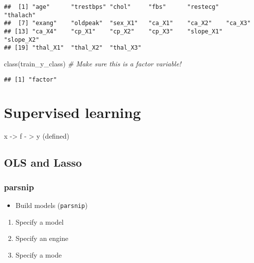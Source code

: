 \documentclass[
]{book}
\newenvironment{Shaded}{\begin{snugshade}}{\end{snugshade}}
\newcommand{\CommentTok}[1]{\textcolor[rgb]{0.56,0.35,0.01}{\textit{#1}}}
\newcommand{\FunctionTok}[1]{\textcolor[rgb]{0.00,0.00,0.00}{#1}}
\newcommand{\NormalTok}[1]{#1}
\providecommand{\tightlist}{%
  \setlength{\itemsep}{0pt}\setlength{\parskip}{0pt}}
\begin{document}
\begin{verbatim}
##  [1] "age"      "trestbps" "chol"     "fbs"      "restecg"  "thalach" 
##  [7] "exang"    "oldpeak"  "sex_X1"   "ca_X1"    "ca_X2"    "ca_X3"   
## [13] "ca_X4"    "cp_X1"    "cp_X2"    "cp_X3"    "slope_X1" "slope_X2"
## [19] "thal_X1"  "thal_X2"  "thal_X3"
\end{verbatim}

\begin{Shaded}
\begin{Highlighting}[]
\FunctionTok{class}\NormalTok{(train\_y\_class) }\CommentTok{\# Make sure this is a factor variable!}
\end{Highlighting}
\end{Shaded}

\begin{verbatim}
## [1] "factor"
\end{verbatim}

\hypertarget{supervised-learning}{%
\section{Supervised learning}\label{supervised-learning}}

x -\textgreater{} f - \textgreater{} y (defined)

\hypertarget{ols-and-lasso}{%
\subsection{OLS and Lasso}\label{ols-and-lasso}}

\hypertarget{parsnip}{%
\subsubsection{parsnip}\label{parsnip}}

\begin{itemize}
\tightlist
\item
  Build models (\texttt{parsnip})
\end{itemize}

\begin{enumerate}
\def\labelenumi{\arabic{enumi}.}
\tightlist
\item
  Specify a model
\item
  Specify an engine
\item
  Specify a mode
\end{enumerate}
\end{document}
